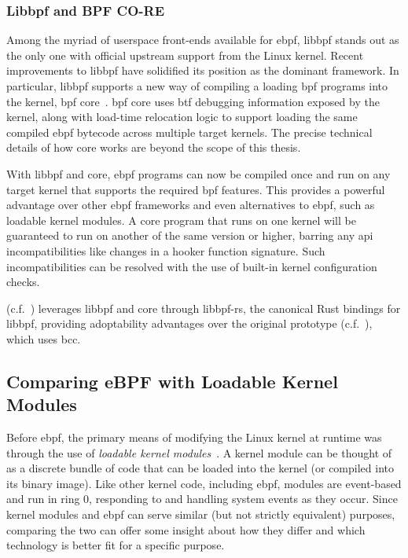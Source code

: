 \subsubsection*{Libbpf and BPF CO-RE}%

Among the myriad of userspace front-ends available for \gls{ebpf}, libbpf stands out as the only
one with official upstream support from the Linux kernel. Recent improvements to libbpf
have solidified its position as the dominant framework. In particular, libbpf supports
a new way of compiling a loading \gls{bpf} programs into the kernel, \gls{bpf}
\gls{core}~\cite{gregg2020_core, nakryiko2020_core}. \gls{bpf} \gls{core} uses \gls{btf}
debugging information exposed by the kernel, along with load-time relocation logic to
support loading the same compiled \gls{ebpf} bytecode across multiple target kernels. The
precise technical details of how \gls{core} works are beyond the scope of this thesis.

With libbpf and \gls{core}, \gls{ebpf} programs can now be compiled once and run on any target kernel
that supports the required \gls{bpf} features. This provides a powerful advantage over other
\gls{ebpf} frameworks and even alternatives to \gls{ebpf}, such as loadable kernel modules. A \gls{core}
program that runs on one kernel will be guaranteed to run on another of the same version
or higher, barring any \gls{api} incompatibilities like changes in a hooker function signature.
Such incompatibilities can be resolved with the use of built-in kernel configuration
checks.

\bpfcontain{} (c.f.~) leverages libbpf and \gls{core} through libbpf-rs, the
canonical Rust bindings for libbpf, providing adoptability advantages over the original
\bpfbox{} prototype (c.f.~), which uses bcc.

\subsection{Comparing eBPF with Loadable Kernel Modules}%
\label{ss:bpf-vs-modules}

Before \gls{ebpf}, the primary means of modifying the Linux kernel at runtime was through the
use of \textit{loadable kernel modules}~\cite{corbet1998_device_drivers}. A kernel module
can be thought of as a discrete bundle of code that can be loaded into the kernel (or
compiled into its binary image). Like other kernel code, including \gls{ebpf}, modules are
event-based and run in ring 0, responding to and handling system events as they occur.
Since kernel modules and \gls{ebpf} can serve similar (but not strictly equivalent) purposes,
comparing the two can offer some insight about how they differ and which technology is
better fit for a specific purpose.

